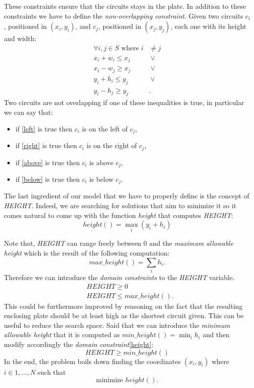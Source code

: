 These constraints ensure that the circuits stays in the plate. In addition to these constraints we have to define the \textit{non-overlapping constraint}. Given two circuits $c_i$, positioned in $(x_i, y_i)$, and $c_j$, positioned in $(x_j, y_j)$, each one with its height and width: 
\begin{align}
    \forall i, j \in  S\text{ where } i &\neq j \nonumber \\
     x_i + w_i \leq x_j& \: \lor \label{left} \\
     x_i - w_j \geq x_j& \: \lor \label{right}\\
     y_i + h_i \leq y_j& \: \lor \label{above}\\
     y_i - h_j \geq y_j& \label{below}.
\end{align}
Two circuits are not overlapping if one of these inequalities is true, in particular we can say that:
\begin{itemize}
    \item if \eqref{left} is true then $c_i$ is on the left of $c_j$,
    \item if \eqref{right} is true then $c_i$ is on the right of $c_j$,
    \item if \eqref{above} is true then $c_i$ is above $c_j$,
    \item if \eqref{below} is true then $c_i$ is below $c_j$.
\end{itemize}
The last ingredient of our model that we have to properly define is the concept of \textit{HEIGHT}. Indeed, we are searching for solutions that aim to minimize it so it comes natural to come up with the function \textit{height} that computes \textit{HEIGHT}:
$$height() = \max_i {(y_i + h_i)}$$ 

Note that, \textit{HEIGHT} can range freely between $0$ and the \textit{maximum allowable height} which is the result of the following computation:
$$max\_{height}() = \sum_i {h_i}.$$ 
Therefore we can introduce the \textit{domain constraints} to the \textit{HEIGHT} variable. 
\begin{align}
    &\textit{HEIGHT} \geq 0 \label{height}\\
        &\textit{HEIGHT} \leq max\_{height}().
\end{align}
This could be furthermore improved by reasoning on the fact that the resulting enclosing plate should be at least high as the shortest circuit given. This can be useful to reduce the search space. Said that we can introduce the \textit{minimum allowable height} that it is computed as $min\_{height}() = \min_i {h_i}$ and then modify accordingly the \textit{domain constraint}\eqref{height}:
\begin{equation}
   \textit{HEIGHT} \geq min\_{height}() 
\end{equation}
In the end, the problem boils down finding the coordinates $(x_i, y_i)$ where $i \in 1, \dots, N$ such that
$$\text{minimize } height().$$

